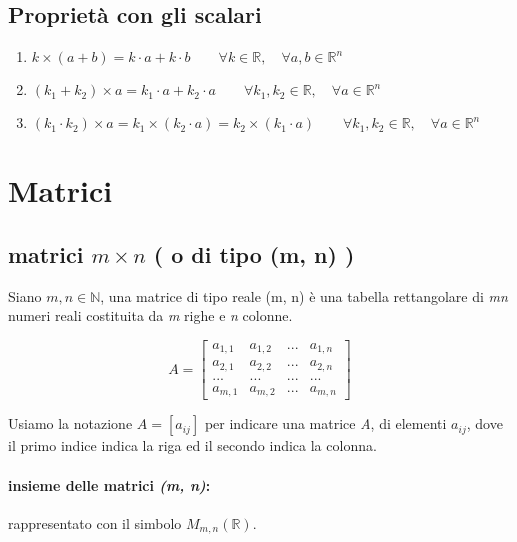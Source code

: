 		\subsection{Proprietà con gli scalari}
			\begin{enumerate}
				\item $ k \times ( a + b ) = k \cdot a + k \cdot b  \qquad \forall k \in \mathbb{R}, \quad \forall a, b \in \mathbb{R}^n$
				\item $ ( k_{1} + k_{2} ) \times a = k_{1} \cdot a + k_{2} \cdot a  \qquad \forall k_{1}, k_{2} \in \mathbb{R}, \quad \forall a \in \mathbb{R}^n$
				\item $ ( k_{1} \cdot k_{2} ) \times a = k_{1} \times ( k_{2} \cdot a ) = k_{2} \times ( k_{1} \cdot a )  \qquad \forall k_{1}, k_{2} \in \mathbb{R}, \quad \forall a \in \mathbb{R}^n$
			\end{enumerate}
	
	\section{Matrici}
		\begin{comment}
		reali
		\end{comment}
		
		\subsection{matrici $ m \times n $ ( o di tipo (m, n) )}
			Siano $ m, n \in \mathbb{N} $, una matrice di tipo reale (m, n) è una tabella rettangolare di \textit{mn} numeri reali costituita da \textit{m} righe e \textit{n} colonne.
			
			$$
			A = 
			\begin{bmatrix}
				a_{1,1} & a_{1,2} & ... & a_{1,n} \\
				a_{2,1} & a_{2,2} & ... & a_{2,n} \\
				... & ... & ... & ... \\
				a_{m,1} & a_{m,2} & ... & a_{m,n}
			\end{bmatrix}
			$$
			
			Usiamo la notazione $ A = [ a_{ij}] $ per indicare una matrice \textit{A}, di elementi $ a_{ij} $, dove il primo indice indica la riga ed il secondo indica la colonna.
			
			\paragraph{insieme delle matrici \textit{(m, n)}:} rappresentato con il simbolo $ M_{m,n} (\mathbb{R}) $.
			
